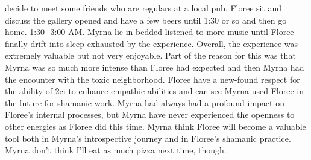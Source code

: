 \documentclass[12pt]{book}
\begin{document}
decide to meet some friends who are regulars at a local pub. Floree sit and discuss the gallery opened and have a few beers until 1:30 or so and then go home. 1:30- 3:00 AM. Myrna lie in bedded listened to more music until Floree finally drift into sleep exhausted by the experience. Overall, the experience was extremely valuable but not very enjoyable. Part of the reason for this was that Myrna was so much more intense than Floree had expected and then Myrna had the encounter with the toxic neighborhood. Floree have a new-found respect for the ability of 2ci to enhance empathic abilities and can see Myrna used Floree in the future for shamanic work. Myrna had always had a profound impact on Floree's internal processes, but Myrna have never experienced the openness to other energies as Floree did this time. Myrna think Floree will become a valuable tool both in Myrna's introspective journey and in Floree's shamanic practice. Myrna don't think I'll eat as much pizza next time, though.
\end{document}
